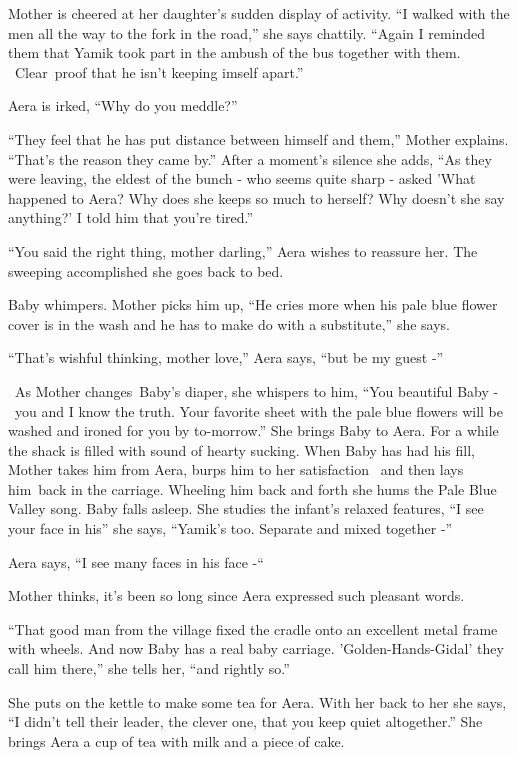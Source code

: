 \documentclass[twoside,11pt]{book}
\begin{document}
Mother is cheered at her daughter's sudden display of activity. ``I walked with the men all the way to the
fork in the road,'' she says chattily. ``Again I reminded them that Yamik took part in the
ambush of the bus together with them. \ Clear~proof that he isn't keeping imself apart.''

Aera is irked, ``Why do you meddle?''

``They feel that he has put distance between himself and them,'' Mother explains.
``That's the reason they came by.'' After a moment's silence she adds, ``As they
were leaving, the eldest of the bunch - who seems quite sharp - asked 'What happened to Aera? Why does she keeps so
much to herself? Why doesn't she say anything?' I told him that you're tired.''

``You said the right thing, mother darling,'' Aera wishes to reassure her. The sweeping
accomplished she goes back to bed.

Baby whimpers. Mother picks him up, ``He cries more when his pale blue flower cover is in the wash and he
has to make do with a substitute,'' she says.

``That's wishful thinking, mother love,'' Aera says, ``but be my guest
-''

~As Mother changes~Baby's diaper, she whispers to him, ``You beautiful Baby - ~you and I know the truth.
Your favorite sheet with the pale blue flowers will be washed and ironed for you by to-morrow.'' She
brings Baby to Aera. For a while the shack is filled with sound of hearty sucking. When Baby has had his fill, Mother
takes him from Aera, burps him to her satisfaction \ and then lays him~back in the carriage. Wheeling him back and
forth she hums the Pale Blue Valley song. Baby falls asleep. She studies the infant's relaxed features,
``I see your face in his'' she says, ``Yamik's too. Separate and mixed together -''

Aera says, ``I see many faces in his face -``~

Mother thinks, it's been so long since Aera expressed such{ }pleasant words.

``That good man from the village fixed the cradle onto{ }an excellent metal frame with
wheels. And now Baby has a real baby carriage. 'Golden-Hands-Gidal' they call him there,'' she tells her, ``and rightly
so.''

She puts on the kettle to make some tea for Aera. With her back to her she says, ``I didn't tell their
leader, the clever one, that you keep quiet altogether.'' She brings Aera a cup of tea with milk and a
piece of cake.
\end{document}
